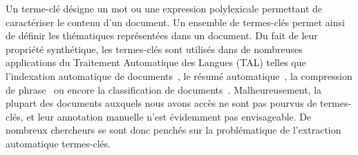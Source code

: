 

  Un terme-clé désigne un mot ou une expression polylexicale permettant de caractériser le contenu d'un document.
  Un ensemble de termes-clés permet ainsi de définir les thématiques représentées dans un document.
  Du fait de leur propriété synthétique, les termes-clés sont utilisés dans de nombreuses applications du Traitement Automatique des Langues (TAL) telles que l'indexation automatique de documents~\cite{medelyan2008smalltrainingset}, le résumé automatique~\cite{avanzo2005keyphrase}, la compression de phrase~\cite{boudin2013multisentencecompression} ou encore la classification de documents~\cite{han2007webdocumentclustering}.
  Malheureusement, la plupart des documents auxquels nous avons accès ne sont pas pourvus de termes-clés, et leur annotation manuelle n'est évidemment pas envisageable.
  De nombreux chercheurs se sont donc penchés sur la problématique de l'extraction automatique termes-clés.

